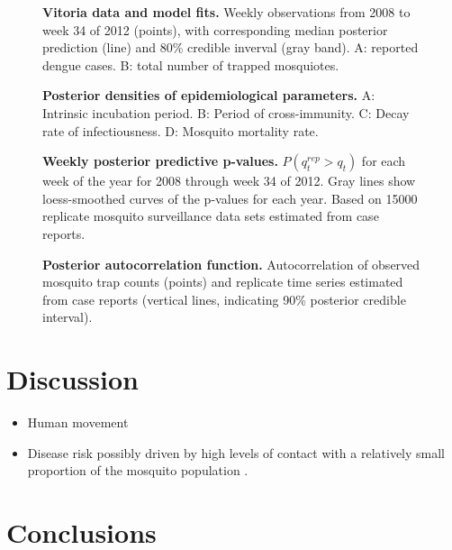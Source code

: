 \documentclass[10pt,letterpaper]{article}
\begin{document}
\begin{figure}[!h]
\caption{{\bf Vitoria data and model fits.}
Weekly observations from 2008 to week 34 of 2012 (points), with corresponding median posterior prediction (line) and 80\% credible inverval (gray band). A: reported dengue cases. B: total number of trapped mosquiotes.
}
\label{timeseries}
\end{figure}

\begin{figure}[!h]
\caption{{\bf Posterior densities of epidemiological parameters.}
A: Intrinsic incubation period. B: Period of cross-immunity. C: Decay rate of infectiousness. D: Mosquito mortality rate.
}
\label{pseries}
\end{figure}

\begin{figure}[!h]
\caption{{\bf Weekly posterior predictive p-values.}
$P(q^{rep}_t > q_t)$ for each week of the year for 2008 through week 34 of 2012. Gray lines show loess-smoothed curves of the p-values for each year. Based on 15000 replicate mosquito surveillance data sets estimated from case reports.
}
\label{pseries}
\end{figure}

\begin{figure}[!h]
\caption{{\bf Posterior autocorrelation function.}
Autocorrelation of observed mosquito trap counts (points) and replicate time series estimated from case reports (vertical lines, indicating 90\% posterior credible interval). 
}
\label{autocorr}
\end{figure}

\section*{Discussion}

\begin{itemize}
\item Human movement \cite{Adams2009, Cosner2009a, Stoddard2009, Dalziel2013}
\item Disease risk possibly driven by high levels of contact with a relatively small proportion of the mosquito population \cite{Canyon1999}.

\end{itemize}

\section*{Conclusions}
\end{document}
